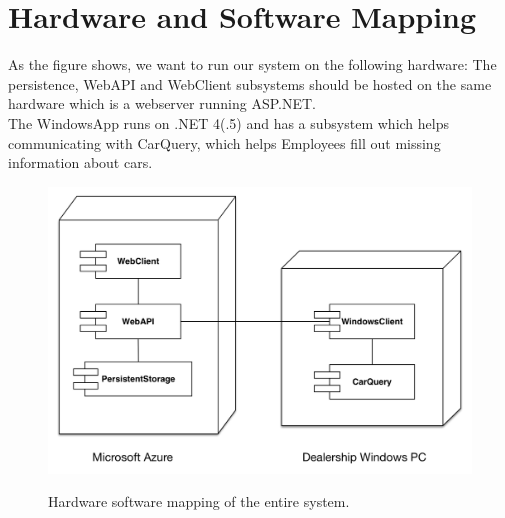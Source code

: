 \section{Hardware and Software Mapping}
As the figure shows, we want to run our system on the following hardware:
The persistence, WebAPI and WebClient subsystems should be hosted on the same hardware which is a webserver running ASP.NET.\\
The WindowsApp runs on .NET 4(.5) and has a subsystem which helps communicating with CarQuery, which helps Employees fill out missing information about cars.

\begin{figure}[h!]
	\centering
		\includegraphics[scale=0.6]{Figures/HardwareSoftwareMapping}\\
	\caption{Hardware software mapping of the entire system.}
  \label{fig:Hardware-Software-Mapping}
\end{figure}